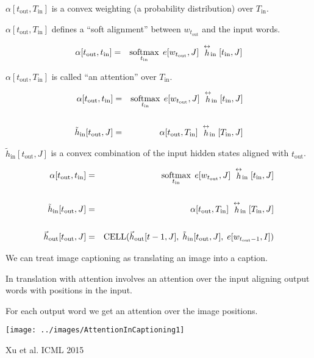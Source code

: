 {\vfill
$\alpha[t_\mathrm{out},T_\mathrm{in}]$ is a convex weighting (a probability distribution) over $T_\mathrm{in}$.

\vfill
$\alpha[t_\mathrm{out},T_\mathrm{in}]$ defines a ``soft alignment'' between  $w_{t_\mathrm{out}}$ and the input words.

\begin{eqnarray*}
  \alpha[t_\mathrm{out},t_{\mathrm{in}}]& =& \operatorname*{softmax}_{t_\mathrm{in}} \;e[w_{t_\mathrm{out}},J]\;\stackrel{\leftrightarrow}{h}_\mathrm{in}[t_{\mathrm{in}},J]
\end{eqnarray*}

\vfill
$\alpha[t_\mathrm{out},T_\mathrm{in}]$ is called ``an attention'' over $T_\mathrm{in}$.

\begin{eqnarray*}
  \alpha[t_\mathrm{out},t_{\mathrm{in}}]& =& \operatorname*{softmax}_{t_\mathrm{in}} \;e[w_{t_\mathrm{out}},J]\;\stackrel{\leftrightarrow}{h}_\mathrm{in}[t_{\mathrm{in}},J] \\
\\
\tilde{h}_\mathrm{in}[t_\mathrm{out},J]& = & \alpha[t_\mathrm{out},T_{\mathrm{in}}]\;\stackrel{\leftrightarrow}{h}_\mathrm{in}[T_{\mathrm{in}},J]
\end{eqnarray*}

\vfill
$\tilde{h}_\mathrm{in}[t_\mathrm{out},J]$ is a convex combination of the input hidden states aligned with $t_\mathrm{out}$.


\begin{eqnarray*}
  \alpha[t_\mathrm{out},t_{\mathrm{in}}]& =& \operatorname*{softmax}_{t_\mathrm{in}} \;e[w_{t_\mathrm{out}},J]\;\stackrel{\leftrightarrow}{h}_\mathrm{in}[t_{\mathrm{in}},J] \\
\\
\tilde{h}_\mathrm{in}[t_\mathrm{out},J]& = & \alpha[t_\mathrm{out},T_{\mathrm{in}}]\;\stackrel{\leftrightarrow}{h}_\mathrm{in}[T_{\mathrm{in}},J] \\
\\
\vec{h}_\mathrm{out}[t_\mathrm{out},J] & = & \mathrm{CELL}(\vec{h}_\mathrm{out}[t-1,J],\;\tilde{h}_\mathrm{in}[t_\mathrm{out},J],\;e[w_{t_\mathrm{out}-1},I])
\end{eqnarray*}

We can treat image captioning as translating an image into a caption.

\vfill
In translation with attention involves an attention over the input aligning output words with positions in the input.

\vfill
For each output word we get an attention over the image positions.


\centerline{\texttt{[image: ../images/AttentionInCaptioning1]}}
\centerline{\Large Xu et al. ICML 2015}

}

